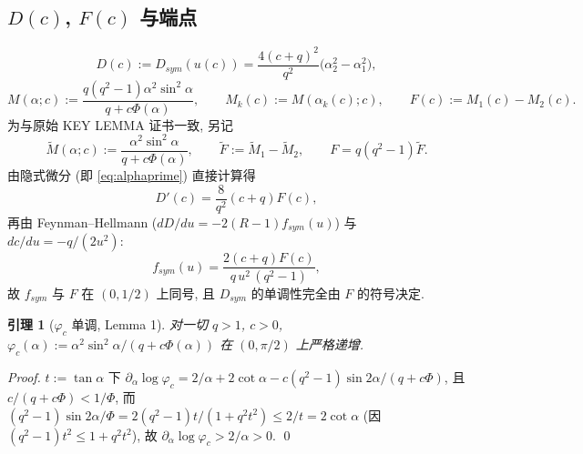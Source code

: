 \documentclass[UTF8]{ctexart}
\newtheorem{lemma}[theorem]{引理}
\begin{document}
\subsection{\texorpdfstring{$D(c)$, $F(c)$}{D(c), F(c)} 与端点}
\begin{equation}
	D(c):=D_{sym}(u(c))=\frac{4(c+q)^2}{q^2}\bigl(\alpha_2^2-\alpha_1^2\bigr),
\end{equation}
\begin{equation}
	M(\alpha;c):=\frac{q(q^2-1)\alpha^2\sin^2\alpha}{q+c\Phi(\alpha)},\qquad
	M_k(c):=M(\alpha_k(c);c),\qquad F(c):=M_1(c)-M_2(c).
\end{equation}
为与原始 KEY LEMMA 证书一致, 另记
\begin{equation}
 \widetilde M(\alpha;c):=\frac{\alpha^2\sin^2\alpha}{q+c\Phi(\alpha)},\qquad
 \widetilde F:=\widetilde M_1-\widetilde M_2,\qquad
 F=q(q^2-1)\widetilde F.
\end{equation}
由隐式微分 (即 \eqref{eq:alphaprime}) 直接计算得
\begin{equation}
	D'(c)=\frac{8}{q^2}(c+q)F(c),
\end{equation}
再由 Feynman--Hellmann ($dD/du=-2(R-1)f_{sym}(u)$) 与 $dc/du=-q/(2u^2)$:
\begin{equation}
	f_{sym}(u)=\frac{2(c+q)F(c)}{q\,u^2\,(q^2-1)},
\end{equation}
故 $f_{sym}$ 与 $F$ 在 $(0,1/2)$ 上同号, 且 $D_{sym}$ 的单调性完全由 $F$ 的符号决定.

\begin{lemma}[$\varphi_c$ 单调, Lemma 1]
对一切 $q>1$, $c>0$,
$\varphi_c(\alpha):=\alpha^2\sin^2\alpha/(q+c\Phi(\alpha))$ 在 $(0,\pi/2)$ 上严格递增.
\end{lemma}
\begin{proof}
$t:=\tan\alpha$ 下
$\partial_\alpha\log\varphi_c=2/\alpha+2\cot\alpha-c(q^2-1)\sin2\alpha/(q+c\Phi)$,
且 $c/(q+c\Phi)<1/\Phi$, 而
$(q^2-1)\sin2\alpha/\Phi=2(q^2-1)t/(1+q^2t^2)\le 2/t=2\cot\alpha$
(因 $(q^2-1)t^2\le1+q^2t^2$), 故 $\partial_\alpha\log\varphi_c>2/\alpha>0$. \qed
\end{proof}
\end{document}
